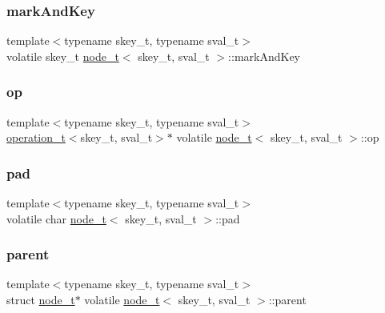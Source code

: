 \subsubsection{\texorpdfstring{mark\+And\+Key}{markAndKey}}
{\footnotesize\ttfamily template$<$typename skey\+\_\+t, typename sval\+\_\+t$>$ \\
volatile skey\+\_\+t \hyperlink{structnode__t}{node\+\_\+t}$<$ skey\+\_\+t, sval\+\_\+t $>$\+::mark\+And\+Key}

\mbox{\label{structnode__t_add56a7213e59cec443dda8f4b786d938}} 
\subsubsection{\texorpdfstring{op}{op}}
{\footnotesize\ttfamily template$<$typename skey\+\_\+t, typename sval\+\_\+t$>$ \\
\hyperlink{unionoperation__t}{operation\+\_\+t}$<$skey\+\_\+t, sval\+\_\+t$>$$\ast$ volatile \hyperlink{structnode__t}{node\+\_\+t}$<$ skey\+\_\+t, sval\+\_\+t $>$\+::op}

\mbox{\label{structnode__t_aa47c298fa082c9997590c3fdb05b796a}} 
\subsubsection{\texorpdfstring{pad}{pad}}
{\footnotesize\ttfamily template$<$typename skey\+\_\+t, typename sval\+\_\+t$>$ \\
volatile char \hyperlink{structnode__t}{node\+\_\+t}$<$ skey\+\_\+t, sval\+\_\+t $>$\+::pad}

\mbox{\label{structnode__t_a36d0dc0f90d0d93c475ef32b6f2b4cfd}} 
\subsubsection{\texorpdfstring{parent}{parent}\hspace{0.1cm}{\footnotesize\ttfamily [1/2]}}
{\footnotesize\ttfamily template$<$typename skey\+\_\+t, typename sval\+\_\+t$>$ \\
struct \hyperlink{structnode__t}{node\+\_\+t}$\ast$ volatile \hyperlink{structnode__t}{node\+\_\+t}$<$ skey\+\_\+t, sval\+\_\+t $>$\+::parent}

